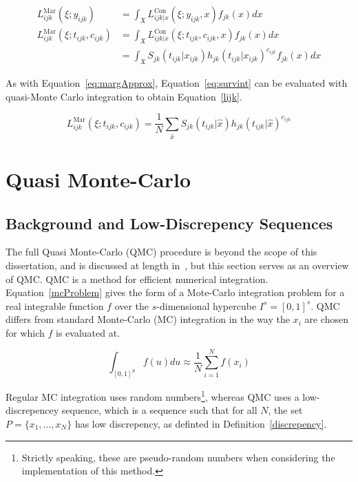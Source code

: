 \begin{align}
    L_{ijk}^{\text{Mar}}(\xi; y_{ijk}) &= \int_{\mathfrak{X}} L_{ijk|x}^{\text{Con}}(\xi; y_{ijk}, x)f_{jk}(x)dx \\ 
    L_{ijk}^{\text{Mar}}(\xi; t_{ijk}, c_{ijk}) &= \int_{\mathfrak{X}} L_{ijk|x}^{\text{Con}}(\xi; t_{ijk}, c_{ijk}, x)f_{jk}(x)dx \\
                                       &= \int_{\mathfrak{X}} S_{jk}(t_{ijk}| x_{ijk})h_{jk}(t_{ijk}|x_{ijk})^{c_{ijk}} f_{jk}(x)dx\label{eq:survint}
\end{align}

As with Equation~\ref{eq:margApprox}, Equation~\ref{eq:survint} can be evaluated with quasi-Monte Carlo integration to obtain Equation~\ref{lijk}. 

\begin{equation}
    L_{ijk}^{\text{Mar}}(\xi; t_{ijk}, c_{ijk}) = \frac{1}{N}\sum_{\hat{x}}S_{jk}(t_{ijk}|\hat{x})h_{jk}(t_{ijk}|\hat{x})^{c_{ijk}}
    \label{lijk}
\end{equation}

\section{Quasi Monte-Carlo}\label{qmcSec}
\subsection{Background and Low-Discrepency Sequences}
The full Quasi Monte-Carlo (QMC) procedure is beyond the scope of this dissertation, and is discussed at length in~\cite{phillippo2019}, but this section serves as an overview of QMC. QMC is a method for efficient numerical integration. Equation~\ref{mcProblem} gives the form of a Mote-Carlo integration problem for a real integrable function $f$ over the $s$-dimensional hypercube $I^s = [0,1]^s$. QMC differs from standard Monte-Carlo (MC) integration in the way the $x_i$ are chosen for which $f$ is evaluated at. 

\begin{equation}
    \int_{[0,1]^S}f(u)du \approx \frac{1}{N}\sum_{i = 1}^{N}f(x_i)
    \label{mcProblem}
\end{equation}

Regular MC integration uses random numbers\footnote{Strictly speaking, these are pseudo-random numbers when considering the implementation of this method.}, whereas QMC uses a low-discrepencey sequence, which is a sequence such that for all $N$, the set $P = \{x_1, \ldots, x_N\}$ has low discrepency, as definted in Definition~\ref{discrepency}.


